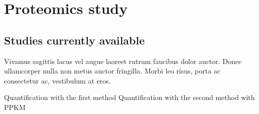 \chapter{Proteomics study}
\label{sec:proteomics}

\section{Studies currently available}

Vivamus sagittis lacus vel augue laoreet rutrum faucibus dolor auctor. Donec ullamcorper nulla non metus auctor fringilla. Morbi leo risus, porta ac consectetur ac, vestibulum at eros.


Quantification with the first method
Quantification with the second method with PPKM
